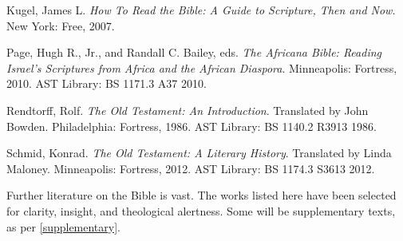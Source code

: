 \documentclass[titlepage]{article}
\begin{document}
\begin{thebibliography}{99}
	 Kugel, James L.
	\emph{How To Read the Bible: A Guide to Scripture, Then and Now}.
	New York: Free, 2007.

	 Page, Hugh R., Jr., and Randall C. Bailey, eds.
	\emph{The Africana Bible: Reading Israel’s Scriptures from Africa and the African Diaspora}.
	Minneapolis: Fortress, 2010.
	AST Library: BS 1171.3 A37 2010.

	 Rendtorff, Rolf.
	\emph{The Old Testament: An Introduction}. Translated by John Bowden.
	Philadelphia: Fortress, 1986.
	AST Library: BS 1140.2 R3913 1986.

	 Schmid, Konrad.
	\emph{The Old Testament: A Literary History}. Translated by Linda Maloney.
	Minneapolis: Fortress, 2012.
	AST Library: BS 1174.3 S3613 2012.

\end{thebibliography}
\endgroup


Further literature on the Bible is vast. The works listed here have been
selected for clarity, insight, and theological alertness. Some will be
supplementary texts, as per \autoref{supplementary}.
\end{document}
